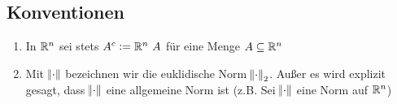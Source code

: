 \subsection{Konventionen}
\begin{enumerate}[label= (\alph*)]
    \item In $\mathbb{R}^n$ sei stets $A^c := \mathbb{R}^n \ A$ für eine Menge $A \subseteq \mathbb{R}^n$
    \item Mit $\norm{\cdot}$ bezeichnen wir die euklidische Norm $\norm{\cdot}_2$.
    Außer es wird explizit gesagt, dass $\norm{\cdot}$ eine allgemeine Norm ist
    (z.B. \glqq{} Sei $\norm{\cdot}$ eine Norm auf $\mathbb{R}^n$)
\end{enumerate}

